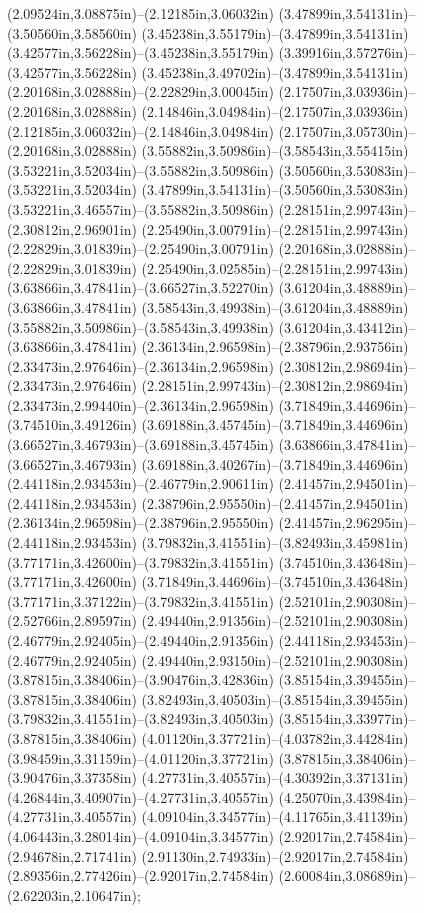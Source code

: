 (2.09524in,3.08875in)--(2.12185in,3.06032in) (3.47899in,3.54131in)--(3.50560in,3.58560in) (3.45238in,3.55179in)--(3.47899in,3.54131in) (3.42577in,3.56228in)--(3.45238in,3.55179in) (3.39916in,3.57276in)--(3.42577in,3.56228in) (3.45238in,3.49702in)--(3.47899in,3.54131in) (2.20168in,3.02888in)--(2.22829in,3.00045in) (2.17507in,3.03936in)--(2.20168in,3.02888in) (2.14846in,3.04984in)--(2.17507in,3.03936in) (2.12185in,3.06032in)--(2.14846in,3.04984in) (2.17507in,3.05730in)--(2.20168in,3.02888in) (3.55882in,3.50986in)--(3.58543in,3.55415in) (3.53221in,3.52034in)--(3.55882in,3.50986in) (3.50560in,3.53083in)--(3.53221in,3.52034in) (3.47899in,3.54131in)--(3.50560in,3.53083in) (3.53221in,3.46557in)--(3.55882in,3.50986in) (2.28151in,2.99743in)--(2.30812in,2.96901in) (2.25490in,3.00791in)--(2.28151in,2.99743in) (2.22829in,3.01839in)--(2.25490in,3.00791in) (2.20168in,3.02888in)--(2.22829in,3.01839in) (2.25490in,3.02585in)--(2.28151in,2.99743in) (3.63866in,3.47841in)--(3.66527in,3.52270in) (3.61204in,3.48889in)--(3.63866in,3.47841in) (3.58543in,3.49938in)--(3.61204in,3.48889in) (3.55882in,3.50986in)--(3.58543in,3.49938in) (3.61204in,3.43412in)--(3.63866in,3.47841in) (2.36134in,2.96598in)--(2.38796in,2.93756in) (2.33473in,2.97646in)--(2.36134in,2.96598in) (2.30812in,2.98694in)--(2.33473in,2.97646in) (2.28151in,2.99743in)--(2.30812in,2.98694in) (2.33473in,2.99440in)--(2.36134in,2.96598in) (3.71849in,3.44696in)--(3.74510in,3.49126in) (3.69188in,3.45745in)--(3.71849in,3.44696in) (3.66527in,3.46793in)--(3.69188in,3.45745in) (3.63866in,3.47841in)--(3.66527in,3.46793in) (3.69188in,3.40267in)--(3.71849in,3.44696in) (2.44118in,2.93453in)--(2.46779in,2.90611in) (2.41457in,2.94501in)--(2.44118in,2.93453in) (2.38796in,2.95550in)--(2.41457in,2.94501in) (2.36134in,2.96598in)--(2.38796in,2.95550in) (2.41457in,2.96295in)--(2.44118in,2.93453in) (3.79832in,3.41551in)--(3.82493in,3.45981in) (3.77171in,3.42600in)--(3.79832in,3.41551in) (3.74510in,3.43648in)--(3.77171in,3.42600in) (3.71849in,3.44696in)--(3.74510in,3.43648in) (3.77171in,3.37122in)--(3.79832in,3.41551in) (2.52101in,2.90308in)--(2.52766in,2.89597in) (2.49440in,2.91356in)--(2.52101in,2.90308in) (2.46779in,2.92405in)--(2.49440in,2.91356in) (2.44118in,2.93453in)--(2.46779in,2.92405in) (2.49440in,2.93150in)--(2.52101in,2.90308in) (3.87815in,3.38406in)--(3.90476in,3.42836in) (3.85154in,3.39455in)--(3.87815in,3.38406in) (3.82493in,3.40503in)--(3.85154in,3.39455in) (3.79832in,3.41551in)--(3.82493in,3.40503in) (3.85154in,3.33977in)--(3.87815in,3.38406in) (4.01120in,3.37721in)--(4.03782in,3.44284in) (3.98459in,3.31159in)--(4.01120in,3.37721in) (3.87815in,3.38406in)--(3.90476in,3.37358in) (4.27731in,3.40557in)--(4.30392in,3.37131in) (4.26844in,3.40907in)--(4.27731in,3.40557in) (4.25070in,3.43984in)--(4.27731in,3.40557in) (4.09104in,3.34577in)--(4.11765in,3.41139in) (4.06443in,3.28014in)--(4.09104in,3.34577in) (2.92017in,2.74584in)--(2.94678in,2.71741in) (2.91130in,2.74933in)--(2.92017in,2.74584in) (2.89356in,2.77426in)--(2.92017in,2.74584in) (2.60084in,3.08689in)--(2.62203in,2.10647in);

